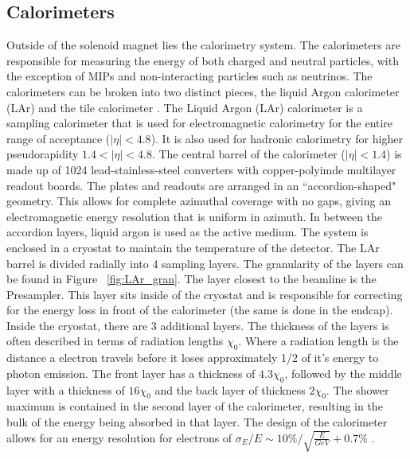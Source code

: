\subsection{Calorimeters}\label{ssec:calo}




Outside of the solenoid magnet lies the calorimetry system. The calorimeters are responsible for measuring the energy of both charged and neutral particles, with the exception of MIPs and non-interacting particles such as neutrinos. The calorimeters can be broken into two distinct pieces, the liquid Argon calorimeter (LAr)\cite{CERN-LHCC-96-041} and the tile calorimeter \cite{CERN-LHCC-96-042}. \linebreak
\indent The Liquid Argon (LAr) calorimeter is a sampling calorimeter that is used for electromagnetic calorimetry for the entire range of acceptance (${|\eta{}|<4.8}$). It is also used for hadronic calorimetry for higher pseudorapidity ${1.4<|\eta{}|<4.8}$. The central barrel of the calorimeter (${|\eta{}| < 1.4}$) is made up of 1024 lead-stainless-steel converters with copper-polyimde multilayer readout boards. The plates and readouts are arranged in an ``accordion-shaped" geometry. This allows for complete azimuthal coverage with no gaps, giving an electromagnetic energy resolution that is uniform in azimuth. In between the accordion layers, liquid argon is used as the active medium. The system is enclosed in a cryostat to maintain the temperature of the detector. The LAr barrel is divided radially into 4 sampling layers. The granularity of the layers can be found in Figure ~\ref{fig:LAr_gran}. The layer closest to the beamline is the Presampler. This layer sits inside of the cryostat and is responsible for  correcting for the energy loss in front of the calorimeter (the same is done in the endcap). Inside the cryostat, there are 3 additional layers. The thickness of the layers is often described in terms of radiation lengths ${\chi_{0}}$. Where a radiation length is the distance a electron travels before it loses approximately 1/2 of it's energy to photon emission.  The front layer has a thickness of ${4.3\chi_{0}}$, followed by the middle layer with a thickness of ${16\chi_{0}}$ and the back layer of thickness ${2\chi_{0}}$. The shower maximum is contained in the second layer of the calorimeter, resulting in the bulk of the energy being absorbed in that layer. The design of the calorimeter allows for an energy resolution for electrons of ${\sigma_{E}/E \sim 10\%/\sqrt{\frac{E}{GeV}} + 0.7\%}$ \cite{Aad:2014nim}.\linebreak 

